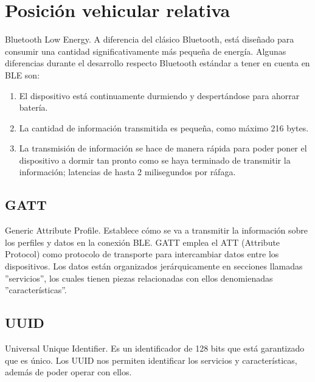 \section{Posición vehicular relativa}
Bluetooth Low Energy. A diferencia del clásico Bluetooth, está diseñado para consumir una cantidad
significativamente más pequeña de energía. Algunas diferencias durante el desarrollo respecto
Bluetooth estándar a tener en cuenta en BLE son:
\begin{enumerate}
	\item El dispositivo está continuamente durmiendo y despertándose para ahorrar batería.
	\item La cantidad de información transmitida es pequeña, como máximo 216 bytes.
	\item La transmisión de información se hace de manera rápida para poder poner el dispositivo
	a dormir tan pronto como se haya terminado de transmitir la información; latencias de hasta
	2 milisegundos por ráfaga.
\end{enumerate}

\subsection{GATT}
Generic Attribute Profile. Establece cómo se va a transmitir la información sobre los perfiles y
datos en la conexión BLE. GATT emplea el ATT (Attribute Protocol) como protocolo de transporte para
intercambiar datos entre los dispositivos. Los datos están organizados jerárquicamente en secciones
llamadas ''servicios'', los cuales tienen piezas relacionadas con ellos denomienadas ''características''.

\subsection{UUID}
Universal Unique Identifier. Es un identificador de 128 bits que está garantizado que es único. Los
UUID nos permiten identificar los servicios y características, además de poder operar con ellos.
